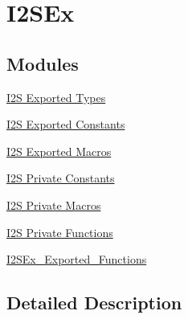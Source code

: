 \hypertarget{group___i2_s_ex}{}\section{I2\+S\+Ex}
\label{group___i2_s_ex}
\subsection*{Modules}
\begin{DoxyCompactItemize}
\item 
\hyperlink{group___i2_s_ex___exported___types}{I2\+S Exported Types}
\item 
\hyperlink{group___i2_s_ex___exported___constants}{I2\+S Exported Constants}
\item 
\hyperlink{group___i2_s_ex___exported___macros}{I2\+S Exported Macros}
\item 
\hyperlink{group___i2_s_ex___private___constants}{I2\+S Private Constants}
\item 
\hyperlink{group___i2_s_ex___private___macros}{I2\+S Private Macros}
\item 
\hyperlink{group___i2_s_ex___private___functions}{I2\+S Private Functions}
\item 
\hyperlink{group___i2_s_ex___exported___functions}{I2\+S\+Ex\+\_\+\+Exported\+\_\+\+Functions}
\end{DoxyCompactItemize}


\subsection{Detailed Description}
